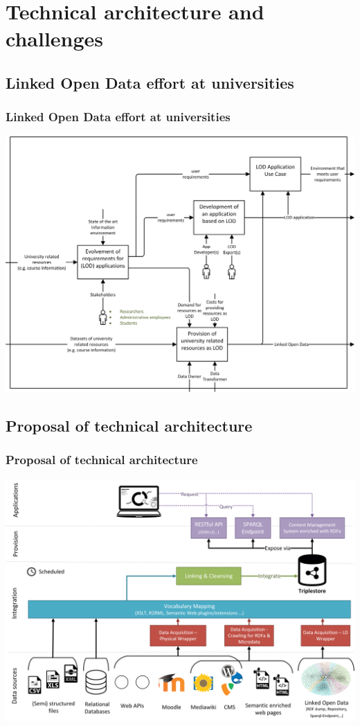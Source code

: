 \documentclass{beamer}
\begin{document}
\section[Technical architecture and challenges]{Technical architecture and challenges}
\begin{frame}
\subsection{Linked Open Data effort at universities}
\frametitle{Linked Open Data effort at universities}
	\includegraphics[width=\columnwidth]{../images/technical-architecture/lod_at_tuwien_idef0.png}
\end{frame}
\begin{frame}
\subsection{Proposal of technical architecture}
\frametitle{Proposal of technical architecture}
	\includegraphics[width=\columnwidth]{../images/technical-architecture/lod_technical_architecture.png}
\end{frame}
\end{document}
